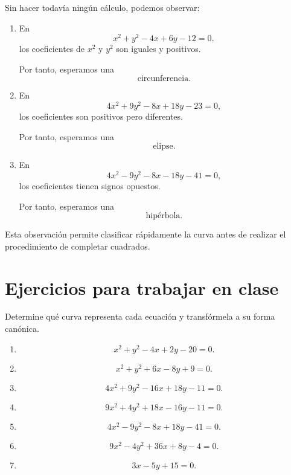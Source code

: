 \documentclass[12pt]{article}
\theoremstyle{plain}
\theoremstyle{definition}
\theoremstyle{remark}
\begin{document}
{Sin hacer todavía ningún cálculo, podemos observar:

\begin{enumerate}

\item En
\[
x^2+y^2-4x+6y-12=0,
\]
los coeficientes de \(x^2\) y \(y^2\) son iguales y positivos.

Por tanto, esperamos una
\[
\boxed{\text{circunferencia}.}
\]

\item En
\[
4x^2+9y^2-8x+18y-23=0,
\]
los coeficientes son positivos pero diferentes.

Por tanto, esperamos una
\[
\boxed{\text{elipse}.}
\]

\item En
\[
4x^2-9y^2-8x-18y-41=0,
\]
los coeficientes tienen signos opuestos.

Por tanto, esperamos una
\[
\boxed{\text{hipérbola}.}
\]

\end{enumerate}

Esta observación permite clasificar rápidamente la curva antes de
realizar el procedimiento de completar cuadrados.

\section*{Ejercicios para trabajar en clase}

Determine qué curva representa cada ecuación y transfórmela a su forma
canónica.

\begin{enumerate}

\item
\[
x^2+y^2-4x+2y-20=0.
\]

\item
\[
x^2+y^2+6x-8y+9=0.
\]

\item
\[
4x^2+9y^2-16x+18y-11=0.
\]

\item
\[
9x^2+4y^2+18x-16y-11=0.
\]

\item
\[
4x^2-9y^2-8x+18y-41=0.
\]

\item
\[
9x^2-4y^2+36x+8y-4=0.
\]

\item
\[
3x-5y+15=0.
\]


\end{enumerate}}
\end{document}
